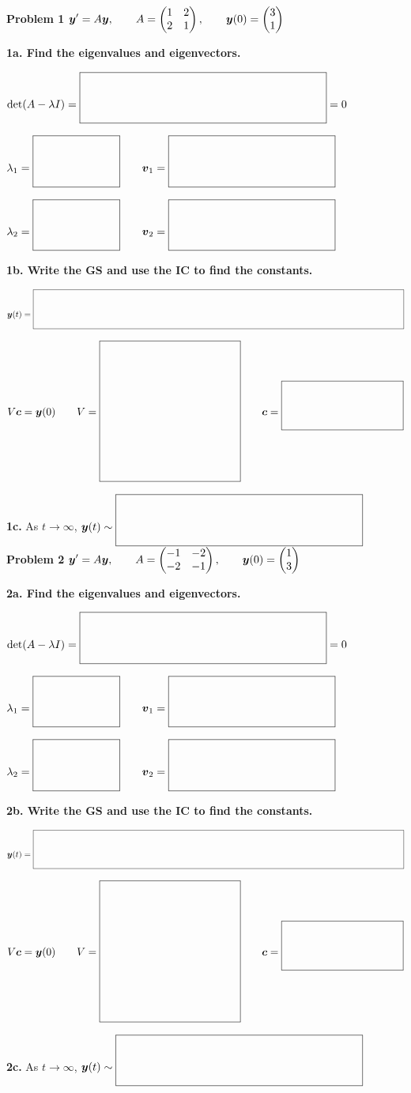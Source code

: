 \documentclass[11pt,letterpaper]{article}
\newcommand{\EigenBlank}[1][2in]{\boxed{\rule[-0.15in]{0pt}{0.55in}\makebox[#1]{}}}
\begin{document}

\textbf{Problem 1}\quad
$\displaystyle \boldsymbol{y}'=A\boldsymbol{y},\qquad
A=\begin{pmatrix}1&2\\2&1\end{pmatrix},\qquad
\boldsymbol{y}(0)=\begin{pmatrix}3\\1\end{pmatrix}$

\textbf{1a. Find the eigenvalues and eigenvectors.}

$\displaystyle \det(A-\lambda I)=\EigenBlank[3in]=0$

\vspace{0.25in}
$\displaystyle \lambda_1=\EigenBlank[1in]\qquad
\vect{v}_1=\EigenBlank[2in]$

$\displaystyle \lambda_2=\EigenBlank[1in]\qquad
\vect{v}_2=\EigenBlank[2in]$

\vfill
\textbf{1b. Write the GS and use the IC to find the constants.}

$\displaystyle \vect{y}(t)=\EigenBlank[6in]$

\vspace{0.2in}
$\displaystyle V\vect{c}=\vect{y}(0)\qquad
V=\boxed{\rule[-0.825in]{0pt}{1.75in}\makebox[1.75in]{}}\qquad \vect{c}=\EigenBlank[1.5in]$

\vfill
\textbf{1c.} As $t\to\infty$, $\displaystyle \vect{y}(t)\sim\EigenBlank[3in]$
\newpage
\textbf{Problem 2}\quad
$\displaystyle \boldsymbol{y}'=A\boldsymbol{y},\qquad
A=\begin{pmatrix}-1&-2\\-2&-1\end{pmatrix},\qquad
\boldsymbol{y}(0)=\begin{pmatrix}1\\3\end{pmatrix}$

\textbf{2a. Find the eigenvalues and eigenvectors.}

$\displaystyle \det(A-\lambda I)=\EigenBlank[3in]=0$

\vspace{0.25in}
$\displaystyle \lambda_1=\EigenBlank[1in]\qquad
\vect{v}_1=\EigenBlank[2in]$

$\displaystyle \lambda_2=\EigenBlank[1in]\qquad
\vect{v}_2=\EigenBlank[2in]$

\vfill
\textbf{2b. Write the GS and use the IC to find the constants.}

$\displaystyle \vect{y}(t)=\EigenBlank[6in]$

\vspace{0.2in}
$\displaystyle V\vect{c}=\vect{y}(0)\qquad
V=\boxed{\rule[-0.825in]{0pt}{1.75in}\makebox[1.75in]{}}\qquad \vect{c}=\EigenBlank[1.5in]$

\vfill
\textbf{2c.} As $t\to\infty$, $\displaystyle \vect{y}(t)\sim\EigenBlank[3in]$
\end{document}
